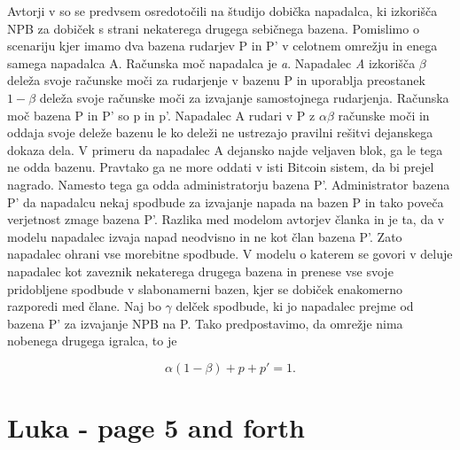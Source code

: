 \documentclass[12pt]{article}
\begin{document}
Avtorji v \cite{powersplitting} so se predvsem osredotočili na študijo dobička napadalca, ki izkorišča NPB za dobiček s strani nekaterega drugega sebičnega bazena. Pomislimo o scenariju kjer imamo dva bazena rudarjev P in P' v celotnem omrežju in enega samega napadalca A. Računska moč napadalca je \textit{a}. Napadalec \textit{A} izkorišča $\beta$ deleža svoje računske moči za rudarjenje v bazenu P in uporablja preostanek $1-\beta$ deleža svoje računske moči za izvajanje samostojnega rudarjenja. Računska moč bazena P in P' so p in p'. Napadalec A rudari v P  z $\alpha \beta $ računske moči in oddaja svoje deleže bazenu le ko deleži ne ustrezajo pravilni rešitvi dejanskega dokaza dela. V primeru da napadalec A dejansko najde veljaven blok, ga le tega ne odda bazenu. Pravtako ga ne more oddati v isti Bitcoin sistem, da bi prejel nagrado. Namesto tega ga odda administratorju bazena P'. Administrator bazena P' da napadalcu nekaj spodbude za izvajanje napada na bazen P in tako poveča verjetnost zmage bazena P'. Razlika med modelom avtorjev članka \cite{originalarticle} in \cite{minnersdilemma} je ta, da v modelu \cite{originalarticle} napadalec izvaja napad neodvisno in ne kot član bazena P'. Zato napadalec ohrani vse morebitne spodbude. V modelu o katerem se govori v \cite{minnersdilemma} deluje napadalec kot zaveznik nekaterega drugega bazena in prenese vse svoje pridobljene spodbude v slabonamerni bazen, kjer se dobiček enakomerno razporedi med člane. Naj bo $\gamma$ delček spodbude, ki jo napadalec prejme od bazena P' za izvajanje NPB na P. Tako predpostavimo, da omrežje nima nobenega drugega igralca, to je

\begin{equation} \label{equation:player}
\alpha(1-\beta) + p + p' = 1 .
\end{equation}



\newpage

\section{Luka - page 5 and forth}
\end{document}
